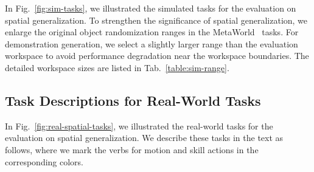 In Fig.~\ref{fig:sim-tasks}, we illustrated the simulated tasks for the evaluation on spatial generalization. To strengthen the significance of spatial generalization, we enlarge the original object randomization ranges in the MetaWorld~\cite{yu2020metaworld} tasks. For demonstration generation, we select a slightly larger range than the evaluation workspace to avoid performance degradation near the workspace boundaries. The detailed workspace sizes are listed in Tab.~\ref{table:sim-range}.



\subsection{Task Descriptions for Real-World Tasks}
In Fig.~\ref{fig:real-spatial-tasks}, we illustrated the real-world tasks for the evaluation on spatial generalization. We describe these tasks in the text as follows, where we mark the verbs for  \textcolor{myorange}{motion} and \textcolor{myblue}{skill} actions in the corresponding colors.

